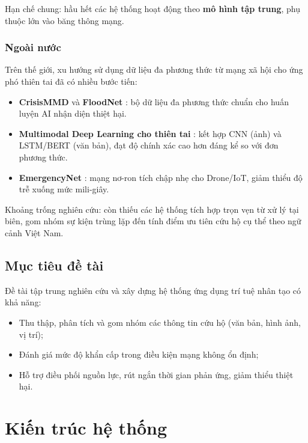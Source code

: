 \documentclass[12pt, a4paper]{report}
\newcommand{\keyword}[1]{\textbf{#1}}
\begin{document}
Hạn chế chung: hầu hết các hệ thống hoạt động theo \keyword{mô hình tập trung}, phụ thuộc lớn vào băng thông mạng.

\subsection{Ngoài nước}

Trên thế giới, xu hướng sử dụng dữ liệu đa phương thức từ mạng xã hội cho ứng phó thiên tai đã có nhiều bước tiến:

\begin{itemize}
  \item \textbf{CrisisMMD} \cite{alam2018crisismmd} và \textbf{FloodNet} \cite{rahnemoonfar2021floodnet}: bộ dữ liệu đa phương thức chuẩn cho huấn luyện AI nhận diện thiệt hại.
  \item \textbf{Multimodal Deep Learning cho thiên tai} \cite{ofli2020multimodal}: kết hợp CNN (ảnh) và LSTM/BERT (văn bản), đạt độ chính xác cao hơn đáng kể so với đơn phương thức.
  \item \textbf{EmergencyNet} \cite{kyrkou2020emergencynet}: mạng nơ-ron tích chập nhẹ cho Drone/IoT, giảm thiểu độ trễ xuống mức mili-giây.
\end{itemize}

Khoảng trống nghiên cứu: còn thiếu các hệ thống tích hợp trọn vẹn từ xử lý tại biên, gom nhóm sự kiện trùng lặp đến tính điểm ưu tiên cứu hộ cụ thể theo ngữ cảnh Việt Nam.

\section{Mục tiêu đề tài}

Đề tài tập trung nghiên cứu và xây dựng hệ thống ứng dụng trí tuệ nhân tạo có khả năng:
\begin{itemize}
  \item Thu thập, phân tích và gom nhóm các thông tin cứu hộ (văn bản, hình ảnh, vị trí);
  \item Đánh giá mức độ khẩn cấp trong điều kiện mạng không ổn định;
  \item Hỗ trợ điều phối nguồn lực, rút ngắn thời gian phản ứng, giảm thiểu thiệt hại.
\end{itemize}

\chapter{Kiến trúc hệ thống}
\end{document}
